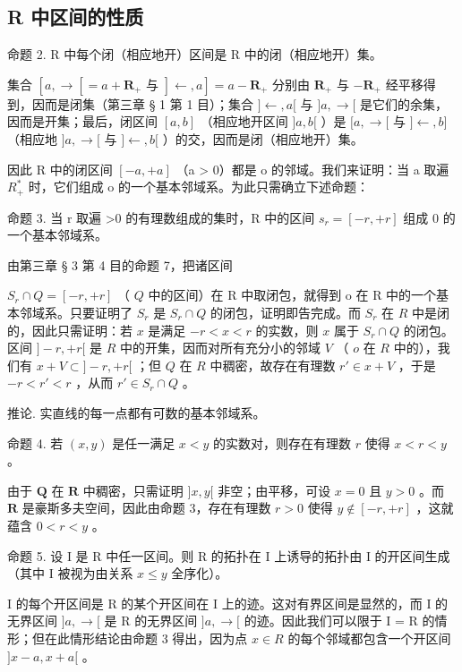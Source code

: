 \subsection{R 中区间的性质}

命题 2. R 中每个闭（相应地开）区间是 R 中的闭（相应地开）集。

集合 \([a, \rightarrow[ = a + \mathbf{R}_+ \text{ 与 } ]\leftarrow, a] = a - \mathbf{R}_+\) 分别由 \(\mathbf{R}_+\) 与 \(-\mathbf{R}_+\) 经平移得到，因而是闭集（第三章 § 1 第 1 目）；集合 \(]\leftarrow, a[\) 与 \(]a, \rightarrow[\) 是它们的余集，因而是开集；最后，闭区间 \([a, b]\) （相应地开区间 \(]a, b[\) ）是 \([a, \rightarrow[\) 与 \(]\leftarrow, b]\) （相应地 \(]a, \rightarrow[\) 与 \(]\leftarrow, b[\) ）的交，因而是闭（相应地开）集。

因此 R 中的闭区间 \([-a, +a]\) （a \textgreater{} 0）都是 o 的邻域。我们来证明：当 a 取遍 \(R_{+}^{*}\) 时，它们组成 o 的一个基本邻域系。为此只需确立下述命题：

命题 3. 当 r 取遍 \textgreater0 的有理数组成的集时，R 中的区间 \(s_{r} = [-r, +r]\) 组成 0 的一个基本邻域系。

由第三章 § 3 第 4 目的命题 7，把诸区间

\(S_{r} \cap Q = [-r, +r]\) （ \(Q\) 中的区间）在 R 中取闭包，就得到 o 在 R 中的一个基本邻域系。只要证明了 \(S_{r}\) 是 \(S_{r} \cap Q\) 的闭包，证明即告完成。而 \(S_{r}\) 在 \(R\) 中是闭的，因此只需证明：若 \(x\) 是满足 \(-r < x < r\) 的实数，则 \(x\) 属于 \(S_{r} \cap Q\) 的闭包。区间 \(]-r, +r[\) 是 \(R\) 中的开集，因而对所有充分小的邻域 \(V\) （ \(o\) 在 \(R\) 中的），我们有 \(x + V \subset ]-r, +r[\) ；但 \(Q\) 在 \(R\) 中稠密，故存在有理数 \(r' \in x + V\) ，于是 \(-r < r' < r\) ，从而 \(r' \in S_{r} \cap Q\) 。

推论. 实直线的每一点都有可数的基本邻域系。

命题 4. 若 \((x, y)\) 是任一满足 \(x < y\) 的实数对，则存在有理数 \(r\) 使得 \(x < r < y\) 。

由于 \(\mathbf{Q}\) 在 \(\mathbf{R}\) 中稠密，只需证明 \(]x, y[\) 非空；由平移，可设 \(x = 0\) 且 \(y > 0\) 。而 \(\mathbf{R}\) 是豪斯多夫空间，因此由命题 3，存在有理数 \(r > 0\) 使得 \(y \notin [-r, +r]\) ，这就蕴含 \(0 < r < y\) 。

命题 5. 设 I 是 R 中任一区间。则 R 的拓扑在 I 上诱导的拓扑由 I 的开区间生成（其中 I 被视为由关系 \(x \leqslant y\) 全序化）。

I 的每个开区间是 R 的某个开区间在 I 上的迹。这对有界区间是显然的，而 I 的无界区间 \(]a, \rightarrow[\) 是 R 的无界区间 \(]a, \rightarrow[\) 的迹。因此我们可以限于 I = R 的情形；但在此情形结论由命题 3 得出，因为点 \(x \in R\) 的每个邻域都包含一个开区间 \(]x - a, x + a[\) 。

